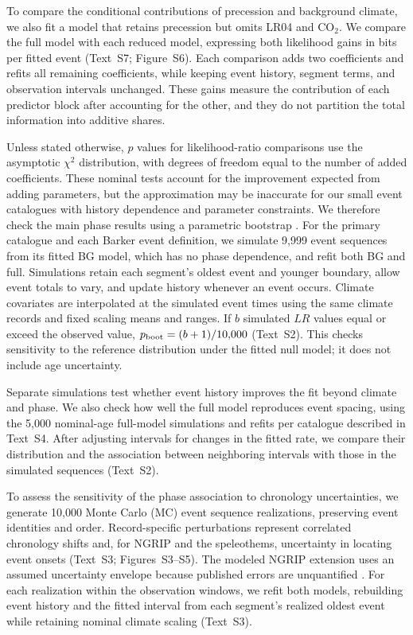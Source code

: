 \documentclass[11pt]{article}
\begin{document}
To compare the conditional contributions of precession and background climate, we also fit a model that retains precession but omits LR04 and CO$_2$. We compare the full model with each reduced model, expressing both likelihood gains in bits per fitted event (Text~S7; Figure~S6). Each comparison adds two coefficients and refits all remaining coefficients, while keeping event history, segment terms, and observation intervals unchanged. These gains measure the contribution of each predictor block after accounting for the other, and they do not partition the total information into additive shares.

Unless stated otherwise, $p$ values for likelihood-ratio comparisons use the asymptotic $\chi^2$ distribution, with degrees of freedom equal to the number of added coefficients. These nominal tests account for the improvement expected from adding parameters, but the approximation may be inaccurate for our small event catalogues with history dependence and parameter constraints. We therefore check the main phase results using a parametric bootstrap \citep{davison1997bootstrap}. For the primary catalogue and each Barker event definition, we simulate 9,999 event sequences from its fitted BG model, which has no phase dependence, and refit both BG and full. Simulations retain each segment's oldest event and younger boundary, allow event totals to vary, and update history whenever an event occurs. Climate covariates are interpolated at the simulated event times using the same climate records and fixed scaling means and ranges. If $b$ simulated $LR$ values equal or exceed the observed value, $p_{\rm boot}=(b+1)/10{,}000$ (Text~S2). This checks sensitivity to the reference distribution under the fitted null model; it does not include age uncertainty.

Separate simulations test whether event history improves the fit beyond climate and phase. We also check how well the full model reproduces event spacing, using the 5,000 nominal-age full-model simulations and refits per catalogue described in Text~S4. After adjusting intervals for changes in the fitted rate, we compare their distribution and the association between neighboring intervals with those in the simulated sequences (Text~S2).

To assess the sensitivity of the phase association to chronology uncertainties, we generate 10,000 Monte Carlo (MC) event sequence realizations, preserving event identities and order. Record-specific perturbations represent correlated chronology shifts and, for NGRIP and the speleothems, uncertainty in locating event onsets (Text~S3; Figures~S3--S5). The modeled NGRIP extension uses an assumed uncertainty envelope because published errors are unquantified \citep{corrick2020synchronous}. For each realization within the observation windows, we refit both models, rebuilding event history and the fitted interval from each segment's realized oldest event while retaining nominal climate scaling (Text~S3).
\end{document}
